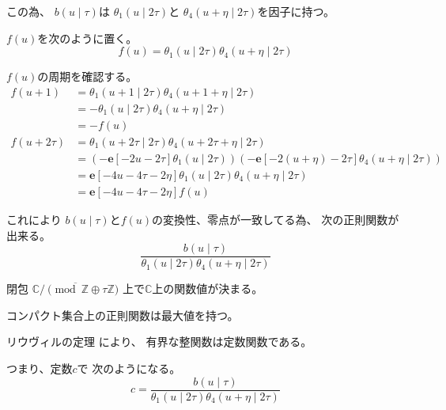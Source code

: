 \documentclass[12pt,b5paper]{ltjsarticle}
\begin{document}
\begin{enumerate}
         この為、
         $b(u\mid\tau)$は
         $\theta_{1}(u \mid 2\tau)$と
         $\theta_{4}(u+\eta \mid 2\tau)$を因子に持つ。

         $f(u)$を次のように置く。
         \begin{equation}
          f(u)=\theta_{1}(u \mid 2\tau) \theta_{4}(u+\eta \mid 2\tau)
         \end{equation}

         $f(u)$の周期を確認する。
         \begin{align}
          f(u+1) &=
          \theta_{1}(u+1 \mid 2\tau) \theta_{4}(u +1 +\eta \mid 2\tau)\\
          &= -\theta_{1}(u \mid 2\tau) \theta_{4}(u +\eta \mid 2\tau)\\
          &= -f(u)\\
          f(u+2\tau) &=
          \theta_{1}(u+2\tau \mid 2\tau) \theta_{4}(u +2\tau +\eta \mid 2\tau)\\
          &= (- \mathbf{e}[-2u-2\tau] \theta_{1}(u \mid 2\tau))( - \mathbf{e}[-2(u+\eta)-2\tau]\theta_{4}(u +\eta \mid 2\tau))\\
          &= \mathbf{e}[-4u-4\tau -2\eta] \theta_{1}(u \mid 2\tau)\theta_{4}(u +\eta \mid 2\tau)\\
          &= \mathbf{e}[-4u-4\tau -2\eta] f(u)
         \end{align}


         これにより
         $b(u\mid\tau)$と$f(u)$の変換性、零点が一致してる為、
         次の正則関数が出来る。
         \begin{equation}
          \frac{b(u\mid\tau)}{\theta_{1}(u \mid 2\tau) \theta_{4}(u+\eta \mid 2\tau)}
         \end{equation}

         閉包
         $\overline{\mathbb{C}/\!\!\!\pmod{\mathbb{Z}\oplus\tau\mathbb{Z}}}$
         上で$\mathbb{C}$上の関数値が決まる。

         コンパクト集合上の正則関数は最大値を持つ。

         リウヴィルの定理
         により、
         有界な整関数は定数関数である。

         つまり、定数$c$で
         次のようになる。
         \begin{equation}
          c=
           \frac{b(u\mid\tau)}{\theta_{1}(u \mid 2\tau) \theta_{4}(u+\eta \mid 2\tau)}
         \end{equation}



\end{enumerate}
\end{document}
